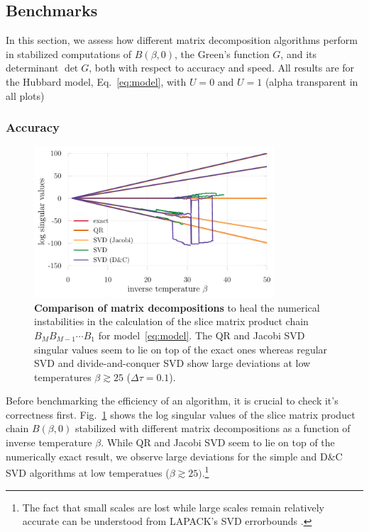 \documentclass[submission, Phys]{SciPost}
\begin{document}
\subsection{Benchmarks}\label{sec:benchmarks}

In this section, we assess how different matrix decomposition algorithms perform in stabilized computations of $B(\beta, 0)$, the Green's function $G$, and its determinant $\det G$, both with respect to accuracy and speed. All results are for the Hubbard model, Eq.~\ref{eq:model}, with $U=0$ and $U=1$ (alpha transparent in all plots)

\subsubsection{Accuracy}

\begin{figure}
	\centering
	\includegraphics[width=0.8\textwidth]{figures/decomp_comparison_simple.pdf}
	\caption{\textbf{Comparison of matrix decompositions} to heal the numerical instabilities in the calculation of the slice matrix product chain $B_M B_{M-1} \cdots B_1$ for model~\eqref{eq:model}. The QR and Jacobi SVD singular values seem to lie on top of the exact ones whereas regular SVD and divide-and-conquer SVD show large deviations at low temperatures $\beta \gtrsim 25$ ($\Delta \tau = 0.1$).}
	\label{fig:decomp_comparison_simple}
\end{figure}

Before benchmarking the efficiency of an algorithm, it is crucial to check it's correctness first. Fig.~\ref{fig:decomp_comparison_simple} shows the log singular values of the slice matrix product chain $B(\beta, 0)$ stabilized with different matrix decompositions as a function of inverse temperature $\beta$. While QR and Jacobi SVD seem to lie on top of the numerically exact result, we observe large deviations for the simple and D\&C SVD algorithms at low temperatues ($\beta \gtrsim 25)$.\footnote{The fact that small scales are lost while large scales remain relatively accurate can be understood from LAPACK's SVD errorbounds \cite{errorbounds}.}\\
\end{document}

